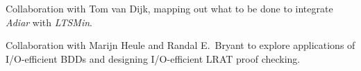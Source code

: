 \begin{itemize}

  Collaboration with Tom van Dijk, mapping out what to be done to integrate
  \emph{Adiar} with \emph{LTSMin}.


  Collaboration with Marijn Heule and Randal E.\ Bryant to explore applications
  of I/O-efficient BDDs and designing I/O-efficient LRAT proof checking.
\end{itemize}
